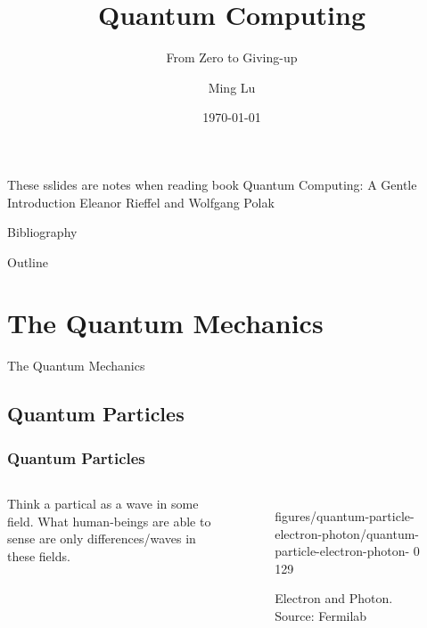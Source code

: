 \documentclass{beamer}
\title{Quantum Computing}
\subtitle{From Zero to Giving-up}
\author{Ming Lu}
\date{\today}
\begin{document}
\begin{frame}
  \titlepage
\end{frame}

\begin{frame}
  These sslides are notes when reading book
  \newline
  \newline
  \LARGE{\textrm{Quantum Computing: A Gentle Introduction}}\tiny\cite{gentleintroduction}
  \newline
  \newline
  \small{\textrm{Eleanor Rieffel and Wolfgang Polak}}
\end{frame}

\begin{frame}{Bibliography}
  \AtNextBibliography{\tiny}
  \printbibliography
\end{frame}

\begin{frame}{Outline}
  \tableofcontents
\end{frame}

\section{The Quantum Mechanics}
\begin{frame}
  The Quantum Mechanics
\end{frame}

\subsection{Quantum Particles}
\begin{frame}
  \frametitle{Quantum Particles}
  \begin{columns}
    Think a partical as a wave in some field.
    What human-beings are able to sense are only differences/waves in these fields.\tiny\cite{quantumparticle}
    \begin{figure}
      {figures/quantum-particle-electron-photon/quantum-particle-electron-photon-}
      {0}
      {129}
      \caption{Electron and Photon. Source: Fermilab}
    \end{figure}
  \end{columns}
\end{frame}
\end{document}
